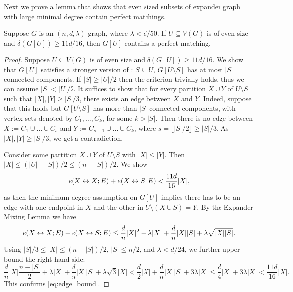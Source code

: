 \documentclass[11pt]{article}
\begin{document}

  
Next we prove a lemma that shows that even sized subsets of expander graph with large minimal degree contain perfect matchings.
\begin{lemma}\label{thm:perfect-matching}
Suppose $G$ is an $(n, d, \lambda)$-graph, where $\lambda < d/50$. If $U \subseteq V(G)$ is of even size and $\delta(G[U]) \ge 11d/16$, then $G[U]$ contains a perfect matching.
\end{lemma}

\begin{proof}
  Suppose $U \subseteq V(G)$ is of even size and $\delta(G[U]) \ge 11d/16$.
  We show that $G[U]$ satisfies a stronger version of :  $S \subseteq U$, $G[U \setminus S]$ has at most $|S|$ connected components.
  If $|S| \ge |U|/2$ then the criterion trivially holds, thus we can assume $|S| < |U|/2$.
  It suffices to show that for every partition $X \cup Y$ of $U \setminus S$ such that $|X|, |Y| \ge |S|/3$, there exists an edge between $X$ and $Y$.
  Indeed, suppose that this holds but $G[U \setminus S]$ has more than $|S|$ connected components, with vertex sets denoted by $C_1, \ldots, C_k$, for some $k > |S|$.
  Then there is no edge between $X := C_1 \cup \ldots \cup C_{s}$ and $Y := C_{s+1} \cup \ldots \cup C_{k}$, where $s = \lfloor |S|/2 \rfloor \ge |S|/3$. As $|X|, |Y| \ge |S|/3$, we get a contradiction. 

    Consider some partition $X \cup Y$ of $U \setminus S$ with $|X| \le |Y|$. Then $|X| \le (|U| - |S|)/2 \le (n - |S|)/2$. We show
    \begin{equation} \label{eq:edge_bound}
        e(X \leftrightarrow X; E) + e(X \leftrightarrow S; E) < \frac{11d}{16}|X|,
    \end{equation}
    as then the minimum degree assumption on $G[U]$ implies there has to be an edge with one endpoint in $X$ and the other in $U \setminus (X \cup S) = Y$. By the Expander Mixing Lemma we have
    \[
        e(X \leftrightarrow X; E) + e(X \leftrightarrow S; E) \le \frac{d}{n}|X|^2 + \lambda |X| + \frac{d}{n}|X||S| + \lambda\sqrt{|X||S|}.
    \]
    Using $|S|/3 \le |X| \le (n-|S|)/2$, $|S| \le n/2$, and $\lambda < d/24$,  we further upper bound the right hand side:
    \[
        \frac{d}{n} |X| \frac{n-|S|}{2} + \lambda |X| + \frac{d}{n}|X||S| + \lambda\sqrt{3} |X| < \frac{d}{2}|X| + \frac{d}{n}|X||S| + 3 \lambda |X| \le \frac{d}{4} |X| + 3\lambda |X| < \frac{11d}{16}|X|.
    \]
    This confirms \eqref{eq:edge_bound}.
\end{proof}
\end{document}
